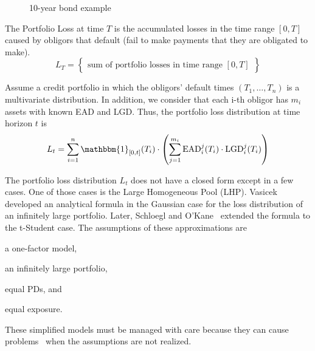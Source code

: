 \documentclass[11pt,fleqn]{book} %
\begin{document}
\begin{figure}[!ht]
	\centering
	\caption{10-year bond example}
	\label{figure:bond} 
\end{figure}

\begin{definition}
	The Portfolio Loss at time $T$ is the accumulated losses in the time 
	range $[0,T]$ caused by obligors that default (fail to make payments 
	that they are obligated to make).
	\begin{displaymath}
		L_T = \left\{
		\begin{array}{c}
			\text{sum of portfolio losses in time range $[0,T]$}
		\end{array}
		\right\}
	\end{displaymath}
\end{definition}

Assume a credit portfolio in which the obligors' default times 
$(T_1,\dots,T_n)$ is a multivariate distribution. In addition, we consider 
that each i-th obligor has $m_i$ assets with known EAD and LGD\@. Thus, 
the portfolio loss distribution at time horizon $t$ is
\begin{displaymath}
	L_t = \displaystyle \sum_{i=1}^n \mathbbm{1}_{[0,t]}(T_i) \cdot 
	\left( 
	\sum_{j=1}^{m_i} \text{EAD}_i^j(T_i) \cdot \text{LGD}_i^j(T_i)
	\right)
\end{displaymath}

The portfolio loss distribution $L_t$ does not have a closed form except 
in a few cases. One of those cases is the Large Homogeneous Pool (LHP).
Vasicek~\cite{vasicek:1987} developed an analytical formula in the Gaussian 
case for the loss distribution of an infinitely large portfolio. Later, 
Schloegl and O'Kane~\cite{schloegl:2005} extended the formula to the 
t-Student case. The assumptions of these approximations are 
\begin{inparaenum}[1)]
	\item a one-factor model, 
	\item an infinitely large portfolio, 
	\item equal PDs, and
	\item equal exposure.
\end{inparaenum}
These simplified models must be managed with care because they can cause 
problems~\cite{long:2012} when the assumptions are not realized.
\end{document}
